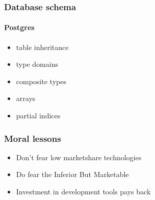 \documentclass[12pt]{beamer}
\begin{document}
\begin{frame}
\frametitle{Database schema}
\framesubtitle{Postgres}

\begin{itemize}
\item	table inheritance
\item	type domains
\item	composite types
\item	arrays
\item	partial indices
\end{itemize}
\end{frame}

\begin{frame}
\frametitle{Moral lessons}

\begin{itemize}
\item	Don't fear low marketshare technologies
\item	Do fear the \alert{I}nferior \alert{B}ut \alert{M}arketable
\item	Investment in development tools pays back
\end{itemize}
\end{frame}
\end{document}
